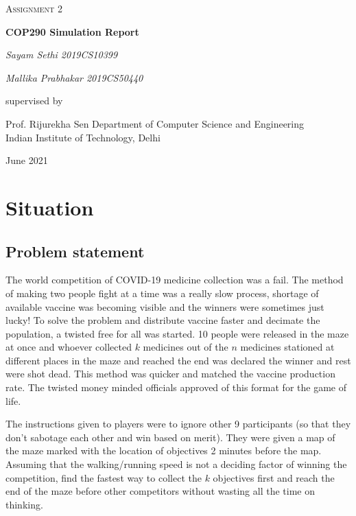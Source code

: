 \documentclass[12pt]{report}
\begin{document}
\begin{titlepage}
	\centering
	\vspace{1cm}
	{\scshape\Large Assignment 2 \par}
	\vspace{1.5cm}
	{\huge\bfseries COP290 Simulation Report\par}
	\vspace{2cm}
	{\Large\itshape Sayam Sethi 2019CS10399\par}
	{\Large\itshape Mallika Prabhakar 2019CS50440\par}
	\vfill
	supervised by\par
	Prof. Rijurekha Sen
    \vfill
	Department of Computer Science and Engineering\\
	Indian Institute of Technology, Delhi\par
	\vfill

	{\large June 2021\par}
\end{titlepage}

\tableofcontents


\chapter{Situation}
\section{Problem statement}

The world competition of COVID-19 medicine collection was a fail. The method of making two people fight at a time was a really slow process, shortage of available vaccine was becoming visible and the winners were sometimes just lucky! To solve the problem and distribute vaccine faster and decimate the population, a twisted free for all was started. 10 people were released in the maze at once and whoever collected $k$ medicines out of the $n$ medicines stationed at different places in the maze and reached the end was declared the winner and rest were shot dead. This method was quicker and matched the vaccine production rate. The twisted money minded officials approved of this format for the game of life.

The instructions given to players were to ignore other 9 participants (so that they don't sabotage each other and win based on merit). They were given a map of the maze marked with the location of objectives 2 minutes before the map. Assuming that the walking/running speed is not a deciding factor of winning the competition, find the fastest way to collect the $k$ objectives first and reach the end of the maze before other competitors without wasting all the time on thinking.
\end{document}
